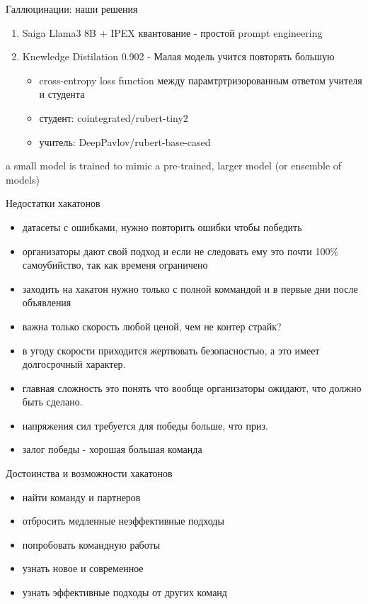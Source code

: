 \documentclass[presentation]{beamer}
\begin{document}
\begin{frame}[label={sec:org16e9c95}]{Галлюцинации: наши решения}
\begin{enumerate}
\item Saiga Llama3 8B + IPEX квантование - простой prompt engineering
\item Knewledge Distilation 0.902 - Малая модель учится повторять большую
\begin{itemize}
\item cross-entropy loss function между парамтртризорованным ответом учителя и студента
\item студент: cointegrated/rubert-tiny2
\item учитель: DeepPavlov/rubert-base-cased
\end{itemize}
\end{enumerate}











a small model is trained to mimic a pre-trained, larger model (or ensemble of models)
\end{frame}

\begin{frame}[label={sec:orgec393e9}]{Недостатки хакатонов}
\begin{itemize}
\item датасеты с ошибками, нужно повторить ошибки чтобы победить
\item организаторы дают свой подход и если не следовать ему это почти 100\% самоубийство, так как временя ограничено
\item заходить на хакатон нужно только с полной коммандой и в первые дни после объявления
\item важна только скорость любой ценой, чем не контер страйк?
\item в угоду скорости приходится жертвовать безопасностью, а это имеет долгосрочный характер.
\item главная сложность это понять что вообще организаторы ожидают, что должно быть сделано.
\item напряжения сил требуется для победы больше, что приз.
\item залог победы - хорошая большая команда
\end{itemize}
\end{frame}

\begin{frame}[label={sec:org0b3e012}]{Достоинства и возможности хакатонов}
\begin{itemize}
\item найти команду и партнеров
\item отбросить медленные неэффективные подходы
\item попробовать командную работы
\item узнать новое и современное
\item узнать эффективные подходы от других команд
\end{itemize}
\end{frame}
\end{document}
